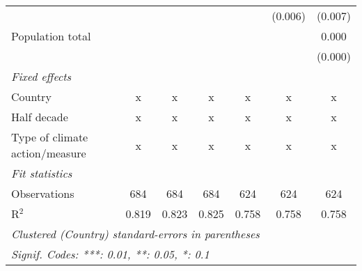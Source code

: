 \begin{tabular}{lcccccc}
                                                         &              &               &               &               & (0.006)       & (0.007)\\   
   Population total                                      &              &               &               &               &               & 0.000\\   
                                                         &              &               &               &               &               & (0.000)\\   
   \emph{Fixed effects}\\
   Country                                               & x            & x             & x             & x             & x             & x\\  
   Half decade                                           & x            & x             & x             & x             & x             & x\\  
   Type of climate action/measure                        & x            & x             & x             & x             & x             & x\\  
   \midrule \emph{Fit statistics}\\
   Observations                                          & 684          & 684           & 684           & 624           & 624           & 624\\  
   R$^2$                                                 & 0.819        & 0.823         & 0.825         & 0.758         & 0.758         & 0.758\\  
   \midrule
   \multicolumn{7}{l}{\emph{Clustered (Country) standard-errors in parentheses}}\\
   \multicolumn{7}{l}{\emph{Signif. Codes: ***: 0.01, **: 0.05, *: 0.1}}\\
\end{tabular}
\par\endgroup


